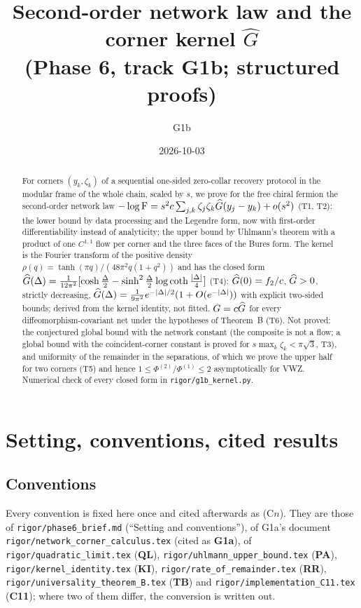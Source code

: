 \documentclass[11pt]{article}
\title{Second-order network law and the corner kernel $\widehat G$\\
\large (Phase 6, track G1b; structured proofs)}
\author{G1b}
\date{2026-10-03}
\theoremstyle{definition}\newtheorem{hypothesis}[theorem]{Hypothesis}
\begin{document}
\maketitle
\sloppy

\begin{abstract}
For corners $(y_k,\zeta_k)$ of a sequential one-sided zero-collar recovery protocol in the modular frame
of the whole chain, scaled by $s$, we prove for the free chiral fermion the second-order network law
$-\log\operatorname{F}=s^2c\sum_{j,k}\zeta_j\zeta_k\widehat G(y_j-y_k)+o(s^2)$ (T1, T2): the lower bound by data processing
and the Legendre form, now with first-order differentiability instead of analyticity; the upper bound by
Uhlmann's theorem with a product of one $C^{1,1}$ flow per corner and the three faces of the Bures form.  The
kernel is the Fourier transform of the positive density
$\rho(q)=\tanh(\pi q)/(48\pi^2q(1+q^2))$ and has the closed form
$\widehat G(\Delta)=\frac1{12\pi^2}[\cosh\frac\Delta2-\sinh^2\frac\Delta2\log\coth\frac{|\Delta|}4]$ (T4):
$\widehat G(0)=f_2/c$, $\widehat G>0$, strictly decreasing, $\widehat G(\Delta)=\frac1{9\pi^2}e^{-|\Delta|/2}(1+O(e^{-|\Delta|}))$ with
explicit two-sided bounds; derived from the kernel identity, not fitted.  $G=c\widehat G$ for every
diffeomorphism-covariant net under the hypotheses of Theorem~B (T6).  Not proved: the conjectured global
bound with the network constant (the composite is not a flow; a global bound with the coincident-corner
constant is proved for $s\max_k\zeta_k<\pi\sqrt3$, T3), and uniformity of the remainder in the separations, of which we prove the upper
half for two corners (T5) and hence $1\le\Phi^{(2)}/\Phi^{(1)}\le2$ asymptotically for VWZ.  Numerical check
of every closed form in \texttt{rigor/g1b\_kernel.py}.
\end{abstract}

\tableofcontents

\section{Setting, conventions, cited results}\label{sec:setting}
\subsection{Conventions}\label{sec:conv}
Every convention is fixed here once and cited afterwards as (C$n$).  They are those of
\texttt{rigor/phase6\_brief.md} (``Setting and conventions''), of G1a's document
\texttt{rigor/network\_corner\_calculus.tex} (cited as \textbf{G1a}), of
\texttt{rigor/quadratic\_limit.tex} (\textbf{QL}), \texttt{rigor/uhlmann\_upper\_bound.tex} (\textbf{PA}),
\texttt{rigor/kernel\_identity.tex} (\textbf{KI}), \texttt{rigor/rate\_of\_remainder.tex} (\textbf{RR}),
\texttt{rigor/universality\_theorem\_B.tex} (\textbf{TB}) and \texttt{rigor/implementation\_C11.tex}
(\textbf{C11}); where two of them differ, the conversion is written out.
\end{document}
